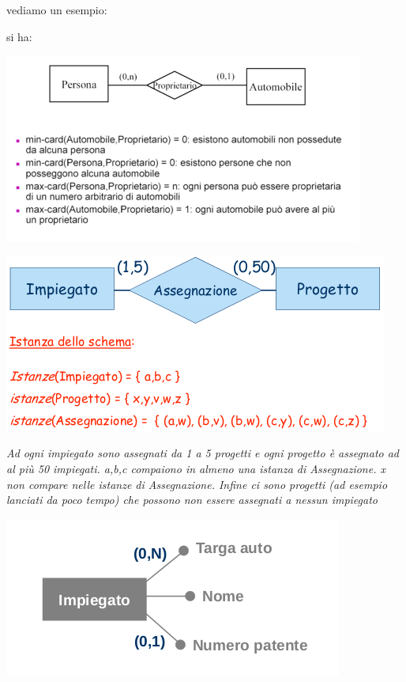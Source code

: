 \documentclass[a4paper,12pt, oneside]{book}
\begin{document}
vediamo un esempio:
\begin{esempio}
si ha:
\begin{center}
\includegraphics[scale=0.8]{img/er8.png}
\end{center}

\end{esempio}
\begin{center}
\includegraphics[scale=0.8]{img/er9.png}
\end{center}
\textit{Ad ogni impiegato sono assegnati da 1 a 5 progetti e ogni progetto è assegnato ad al più 50 impiegati. a,b,c compaiono in almeno una istanza di Assegnazione. x non compare nelle istanze di Assegnazione. Infine ci sono progetti (ad esempio lanciati da poco
tempo) che possono non essere assegnati a nessun
impiegato}\\
\begin{center}
\includegraphics[scale=0.8]{img/er10.png}
\end{center}
\end{document}
